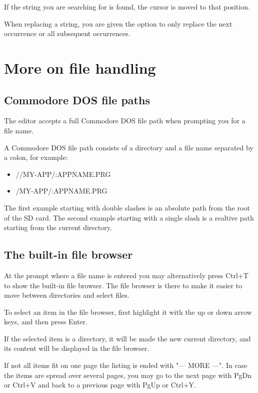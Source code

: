 \documentclass{article}
\begin{document}
        If the string you are searching for is found, the cursor is moved to that position.

        When replacing a string, you are given the option to only replace the
        next occurrence or all subsequent occurrences.

\section{More on file handling}
    \subsection{Commodore DOS file paths}
    The editor accepts a full Commodore DOS file path when prompting you for a file name.

    A Commodore DOS file path consists of a directory and a file name separated by a colon, for
    example:

    \begin{itemize}
        \item //MY-APP/:APPNAME.PRG
        \item /MY-APP/:APPNAME.PRG
    \end{itemize}
    
    The first example starting with double slashes is an absolute path from the root of the SD card. The second
    example starting with a single slash is a realtive path starting from the current directory.

    \subsection{The built-in file browser}
        At the prompt where a file name is entered you may alternatively press Ctrl+T to show the
        built-in file browser. The file browser is there to make it easier to move between directories 
        and select files.
        
        To select an item in the file browser, first highlight it with the up or down arrow keys, and then press Enter.

        If the selected item is a directory, it will be made the new current directory, and its content will
        be displayed in the file browser.

        If not all items fit on one page the listing is ended with "--- MORE ---". 
        In case the items are spread over several pages, you may go to 
        the next page with PgDn or Ctrl+V and back to a previous page with PgUp or Ctrl+Y.
\end{document}
